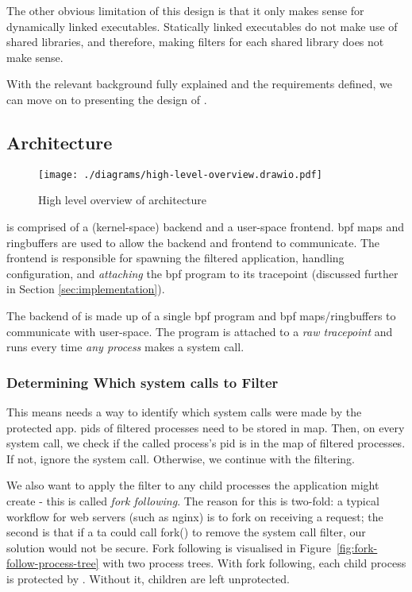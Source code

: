 The other obvious limitation of this design is that it only makes sense for
dynamically linked executables. Statically linked executables do not make use of
shared libraries, and therefore, making filters for each shared library does not
make sense.

With the relevant background fully explained and the requirements defined, we
can move on to presenting the design of \afss.~ 

\subsection{Architecture} \label{subsec:arch}

\begin{figure}[ht]
    \centering
    \texttt{[image: ./diagrams/high-level-overview.drawio.pdf]} 
    \caption{High level overview of \afg architecture}
    \label{fig:arch-overview}
\end{figure}

\af is comprised of a (kernel-space) backend and a user-space frontend.
\ac{bpf} maps and ringbuffers are used to allow the backend and frontend to
communicate. The frontend is responsible for spawning the filtered application,
handling configuration, and \textit{attaching} the \ac{bpf} program to its
tracepoint (discussed further in Section \ref{sec:implementation}).

The backend of \af is made up of a single \ac{bpf} program and \ac{bpf}
maps/ringbuffers to communicate with user-space.
The program is attached to a \textit{raw tracepoint} and runs every time
\textit{any process} makes a system call.

\subsubsection{Determining Which system calls to
Filter}\label{subsec:design-fork-following}

This means \af needs a way to identify which system calls were made by the
protected app. \acp{pid} of filtered processes
need to be stored in  map. Then, on every system call, we check if the
called process's \ac{pid} is in the map of filtered processes. If not, ignore
the system call. Otherwise, we continue with the filtering.

We also want to apply the filter to any child processes the
application might create - this is called \textit{fork following}. The reason for this is two-fold: a typical workflow for
web servers (such as nginx) \cite{apache-prefork-2.4, nginx-inside-performance-scale-2015} is to fork on receiving a request; the second is
that if a \ac{ta} could call fork() to remove the system call filter, our
solution would not be secure. Fork following is visualised in
Figure~\ref{fig:fork-follow-process-tree} with two process trees. With fork
following, each child process is protected by \af. Without it, children
are left unprotected.

